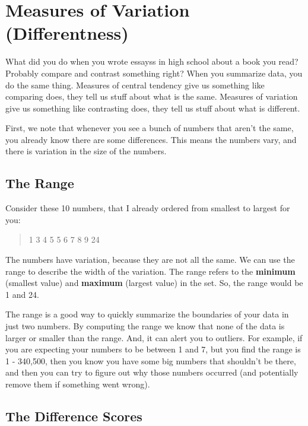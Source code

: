 \documentclass[]{book}
\begin{document}
\hypertarget{measures-of-variation-differentness}{%
\section{Measures of Variation (Differentness)}\label{measures-of-variation-differentness}}

What did you do when you wrote essayss in high school about a book you read? Probably compare and contrast something right? When you summarize data, you do the same thing. Measures of central tendency give us something like comparing does, they tell us stuff about what is the same. Measures of variation give us something like contrasting does, they tell us stuff about what is different.

First, we note that whenever you see a bunch of numbers that aren't the same, you already know there are some differences. This means the numbers vary, and there is variation in the size of the numbers.

\hypertarget{the-range}{%
\subsection{The Range}\label{the-range}}

Consider these 10 numbers, that I already ordered from smallest to largest for you:

\begin{quote}
1 3 4 5 5 6 7 8 9 24
\end{quote}

The numbers have variation, because they are not all the same. We can use the range to describe the width of the variation. The range refers to the \textbf{minimum} (smallest value) and \textbf{maximum} (largest value) in the set. So, the range would be 1 and 24.

The range is a good way to quickly summarize the boundaries of your data in just two numbers. By computing the range we know that none of the data is larger or smaller than the range. And, it can alert you to outliers. For example, if you are expecting your numbers to be between 1 and 7, but you find the range is 1 - 340,500, then you know you have some big numbers that shouldn't be there, and then you can try to figure out why those numbers occurred (and potentially remove them if something went wrong).

\hypertarget{the-difference-scores}{%
\subsection{The Difference Scores}\label{the-difference-scores}}
\end{document}
